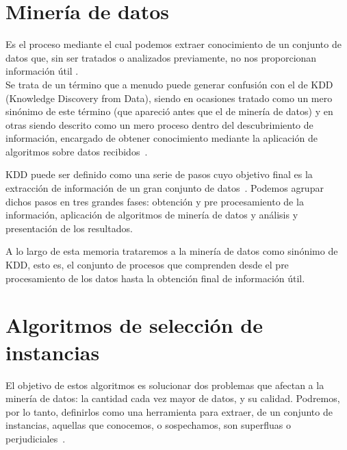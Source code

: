 

\section{Minería de datos}\label{DefMineria}

Es el proceso mediante el cual podemos extraer conocimiento de un conjunto de datos que, sin ser tratados o analizados previamente, no nos proporcionan información útil \cite{DataMiningConcepts}. \\

Se trata de un término que a menudo puede generar confusión con el de KDD (Knowledge Discovery from Data), siendo en ocasiones tratado como un mero sinónimo de este término (que apareció antes que el de minería de datos) y en otras siendo descrito como un mero proceso dentro del descubrimiento de información, encargado de obtener conocimiento mediante la aplicación de algoritmos sobre datos recibidos~\cite{DataMiningConcepts}. 

KDD puede ser definido como una serie de pasos cuyo objetivo final es la extracción de información de un gran conjunto de datos~\cite{DataMiningConcepts}. Podemos agrupar dichos pasos en tres grandes fases: obtención y pre procesamiento de la información, aplicación de algoritmos de minería de datos y análisis y presentación de los resultados.

A lo largo de esta memoria trataremos a la minería de datos como sinónimo de KDD, esto es, el conjunto de procesos que comprenden desde el pre procesamiento de los datos hasta la obtención final de información útil.


\section{Algoritmos de selección de instancias}\label{sec:DefAlgSel}

El objetivo de estos algoritmos es solucionar dos problemas que afectan a la minería de datos: la cantidad cada vez mayor de datos, y su calidad. Podremos, por lo tanto,  definirlos como una herramienta para extraer, de un conjunto de instancias, aquellas que conocemos, o sospechamos, son superfluas o perjudiciales~\cite{IntroInstanceSelect}.

